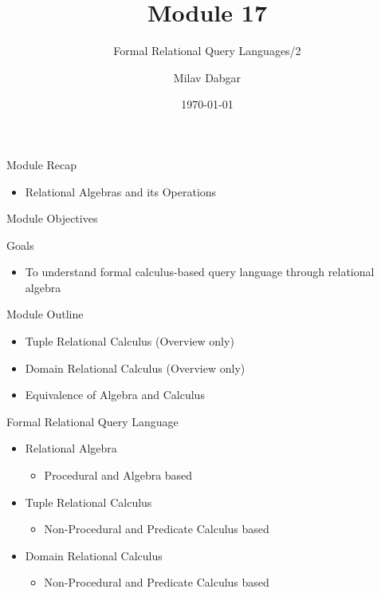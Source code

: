 \documentclass[aspectratio=169, xcolor=dvipsnames]{beamer}
\title{Module 17}
\subtitle{Formal Relational Query Languages/2}
\author{Milav Dabgar}
\institute{www.milav.in}
\date{\today}
\begin{document}
\begin{frame}
    \titlepage
\end{frame}

\begin{frame}{Module Recap}
    \begin{itemize}[<+->]
        \item Relational Algebras and its Operations
    \end{itemize}
\end{frame}

\begin{frame}{Module Objectives}
    \begin{block}{Goals}
        \begin{itemize}[<+->]
            \item To understand formal calculus-based query language through relational algebra
        \end{itemize}
    \end{block}
\end{frame}

\begin{frame}{Module Outline}
    \begin{itemize}[<+->]
        \item Tuple Relational Calculus (Overview only)
        \item Domain Relational Calculus (Overview only)
        \item Equivalence of Algebra and Calculus
    \end{itemize}
\end{frame}

\begin{frame}{Formal Relational Query Language}
    \begin{itemize}[<+->]
        \item Relational Algebra
        \begin{itemize}
            \item[$\triangleright$] Procedural and Algebra based
        \end{itemize}
        \item Tuple Relational Calculus
        \begin{itemize}
            \item[$\triangleright$] Non-Procedural and Predicate Calculus based
        \end{itemize}
        \item Domain Relational Calculus
        \begin{itemize}
            \item[$\triangleright$] Non-Procedural and Predicate Calculus based
        \end{itemize}
    \end{itemize}
\end{frame}
\end{document}
